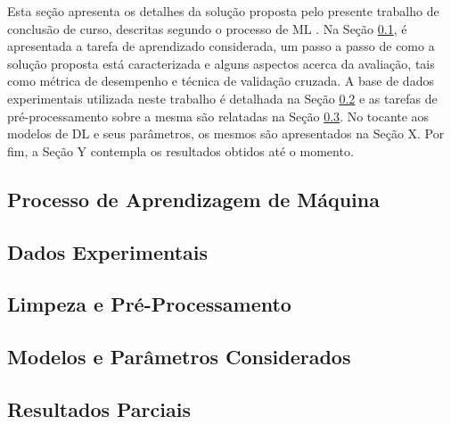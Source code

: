 Esta seção apresenta os detalhes da solução proposta pelo presente trabalho de conclusão de curso, descritas segundo o processo de ML \cite[vide Seção 1.5]{ref:marsland}. Na Seção  \ref{subsec:tarefa}, é apresentada a tarefa de aprendizado considerada, um passo a passo de como a solução proposta está caracterizada e alguns aspectos acerca da avaliação, tais como métrica de desempenho e técnica de validação cruzada. A base de dados experimentais utilizada neste trabalho é detalhada na Seção \ref{subsec:dados} e as tarefas de pré-processamento sobre a mesma são relatadas na Seção \ref{subsec:pre-process}. No tocante aos modelos de DL e seus parâmetros, os mesmos são apresentados na Seção X. Por fim, a Seção Y contempla os resultados obtidos até o momento.


\subsection{Processo de Aprendizagem de Máquina} \label{subsec:tarefa}


\subsection{Dados Experimentais} \label{subsec:dados}


\subsection{Limpeza e Pré-Processamento} \label{subsec:pre-process}


\subsection{Modelos e Parâmetros Considerados}

\subsection{Resultados Parciais} %

%
